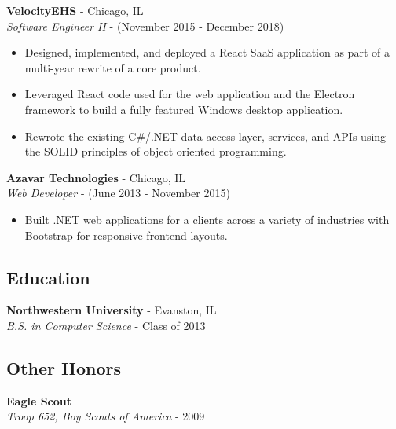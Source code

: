 \documentclass[12pt]{article}
\begin{document}
\begin{paracol}{2}
\noindent \textbf{VelocityEHS} - Chicago, IL \\
\textit{Software Engineer II} - {\footnotesize{(November 2015 - December 2018)}}
\begin{itemize}[leftmargin=*]
    \setlength\itemsep{0em}
    \item {\footnotesize{Designed, implemented, and deployed a React SaaS application as part of a multi-year rewrite of a core product.}}
    \item {\footnotesize{Leveraged React code used for the web application and the Electron framework to build a fully featured Windows desktop application.}}
    \item {\footnotesize{Rewrote the existing C\#/.NET data access layer, services, and APIs using the SOLID principles of object oriented programming.}}
\end{itemize} 

\noindent \textbf{Azavar Technologies} - Chicago, IL \\
\textit{Web Developer} - {\footnotesize(June 2013 - November 2015)}
\begin{itemize}[leftmargin=*]
    \setlength\itemsep{0em}
    \item {\footnotesize{Built .NET web applications for a clients across a variety of industries with Bootstrap for responsive frontend layouts.}} 
\end{itemize}

\subsection*{Education}
\textbf{Northwestern University} - Evanston, IL \\
\textit{B.S. in Computer Science} - {\footnotesize{Class of 2013}}

\subsection*{Other Honors}
\textbf{Eagle Scout} \\
\textit{Troop 652, Boy Scouts of America} - {\footnotesize{2009}}
    
\end{paracol}
\end{document}
